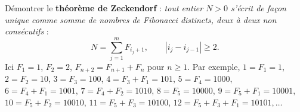 Démontrer le \textbf{théorème de Zeckendorf} : \emph{tout entier $N > 0$ s'écrit de façon unique comme somme de nombres de Fibonacci distincts, deux à deux non consécutifs} :
\[ N = \sum_{j=1}^m F_{i_j+1},\qquad |i_j - i_{j-1}| \geq 2. \]
Ici $F_1 = 1$, $F_2 = 2$, $F_{n+2} = F_{n+1} + F_n$ pour $n \geq 1$. Par exemple, $1 = F_1 = 1$, $2 = F_2 = 10$, $3 = F_3 = 100$, $4 = F_3 + F_1 = 101$, $5 = F_4 = 1000$, $6 = F_4 + F_1 = 1001$, $7 = F_4 + F_2 = 1010$, $8 = F_5 = 10000$, $9 = F_5 + F_1 = 10001$, $10 = F_5 + F_2 = 10010$, $11 = F_5 + F_3 = 10100$, $12 = F_5 + F_3 + F_1 = 10101, \ldots$
